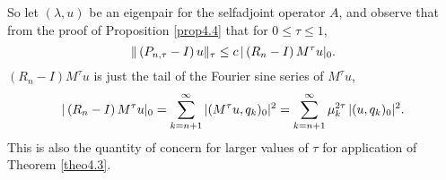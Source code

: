 \documentclass[final]{siamltex}
\numberwithin{equation}{section}
\begin{document}
So let $(\lambda, u)$ be an eigenpair for the selfadjoint operator $A$, and observe that from the proof of Proposition \ref{prop4.4} that for $0 \le \tau \le 1$,
\begin{equation} \notag
\|\left(P_{n, \tau} - I\right) u \|_{\tau} \le c \, |\left(R_n -I \right) M^{\tau} u|_0.
\end{equation}
$\left(R_n -I \right) M^{\tau} u$ is just the tail of the Fourier sine series of $M^{\tau} u$,
\begin{equation} \notag
|\left(R_n -I \right) M^{\tau} u|_0=\sum_{k=n+1}^{\infty} |(M^{\tau} u, q_k)_0|^2 = \sum_{k=n+1}^{\infty} \mu_k^{2\tau} \, |(u, q_k)_0|^2.
\end{equation}
This is also the quantity of concern for larger values of $\tau$ for application of Theorem \ref{theo4.3}.
\end{document}
